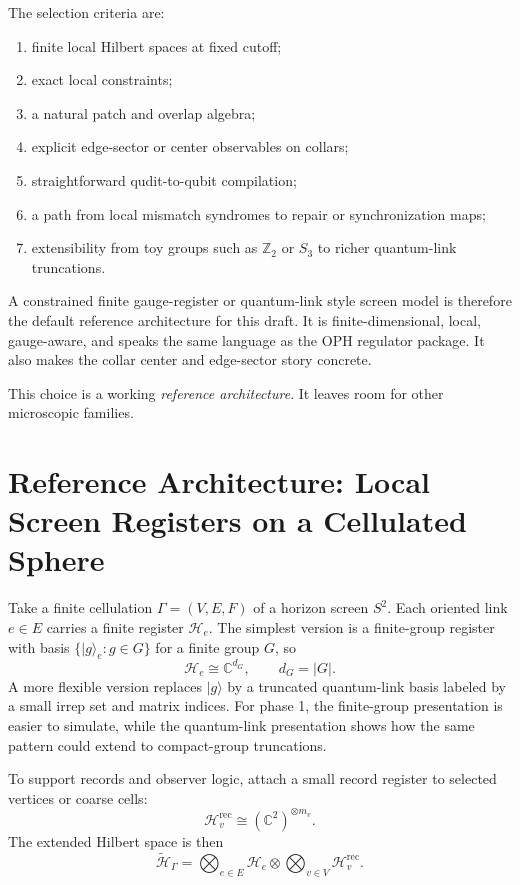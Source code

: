 \documentclass[11pt]{article}
\begin{document}
The selection criteria are:
\begin{enumerate}[leftmargin=2em]
\item finite local Hilbert spaces at fixed cutoff;
\item exact local constraints;
\item a natural patch and overlap algebra;
\item explicit edge-sector or center observables on collars;
\item straightforward qudit-to-qubit compilation;
\item a path from local mismatch syndromes to repair or synchronization maps;
\item extensibility from toy groups such as $\mathbb Z_2$ or $S_3$ to richer quantum-link
truncations.
\end{enumerate}

A constrained finite gauge-register or quantum-link style screen model is therefore the
default reference architecture for this draft. It is finite-dimensional, local, gauge-aware,
and speaks the same language as the OPH regulator package. It also makes the collar
center and edge-sector story concrete.

This choice is a working \emph{reference architecture}. It leaves room for other
microscopic families.

\section{Reference Architecture: Local Screen Registers on a Cellulated Sphere}

Take a finite cellulation $\Gamma=(V,E,F)$ of a horizon screen $S^2$. Each oriented link
$e\in E$ carries a finite register $\mathcal H_e$. The simplest version is a finite-group
register with basis $\{|g\rangle_e:g\in G\}$ for a finite group $G$, so
\begin{equation}
\mathcal H_e \cong \mathbb C^{d_G},\qquad d_G=|G|.
\end{equation}
A more flexible version replaces $|g\rangle$ by a truncated quantum-link basis labeled by a
small irrep set and matrix indices. For phase 1, the finite-group presentation is easier to
simulate, while the quantum-link presentation shows how the same pattern could extend to
compact-group truncations.

To support records and observer logic, attach a small record register to selected vertices or
coarse cells:
\begin{equation}
\mathcal H_v^{\mathrm{rec}} \cong (\mathbb C^2)^{\otimes m_v}.
\end{equation}
The extended Hilbert space is then
\begin{equation}
\widetilde{\mathcal H}_{\Gamma}=
\bigotimes_{e\in E}\mathcal H_e
\otimes
\bigotimes_{v\in V}\mathcal H_v^{\mathrm{rec}}.
\end{equation}
\end{document}
